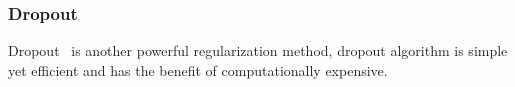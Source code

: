 \subsubsection{Dropout}

Dropout~\cite{JMLR:v15:srivastava14a} is another powerful regularization method, dropout algorithm is simple yet efficient and has the benefit of   computationally  expensive. 